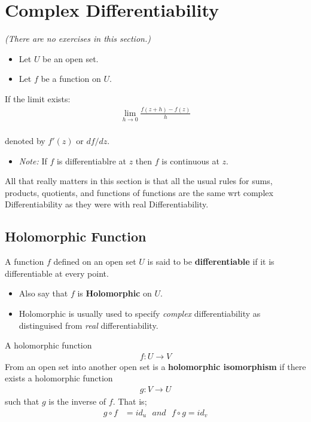 \section{Complex Differentiability}
\textit{(There are no exercises in this section.)}
\begin{itemize}
	\item Let $U$ be an open set. 
	\item Let $f$ be a function on $U.$
\end{itemize}

\begin{defn}
	If the limit exists:
	\begin{align*}
		\lim_{h \to 0} \frac{f(z + h) - f(z)}{h} \\
	\end{align*}


	denoted by $f'(z)$ or $df/dz.$
\end{defn}
\begin{itemize}
	\item \textit{Note:} If $f$ is differentiablre at $z$ then $f$ is continuous at $z.$
\end{itemize}

All that really matters in this section 
is that all the usual rules for sums, products, quotients, and functions of functions are the same 
wrt complex Differentiability as they were with real Differentiability.

\subsection{Holomorphic Function}
A function $f$ defined on an open set $U$ is said to be \textbf{differentiable} if it is differentiable at every point.
\begin{itemize}
	\item Also say that $f$ is \textbf{Holomorphic} on $U.$
	\item Holomorphic is usually used to specify \textit{complex} differentiability as distinguised from \textit{real} differentiability.
\end{itemize}


\begin{defn}
	A holomorphic function
	\begin{align*}
		f: U \to V
	\end{align*}
	From an open set into another open set is a \textbf{holomorphic isomorphism} if there exists a holomorphic function
	\begin{align*}
		g: V \to U
	\end{align*}
	such that $g$ is the inverse of $f.$ That is;
	\begin{align*}
		g \circ f &= id_u \,\,\,\,
		and \,\,\,\,
		f \circ g = id_v
	\end{align*}
\end{defn}

